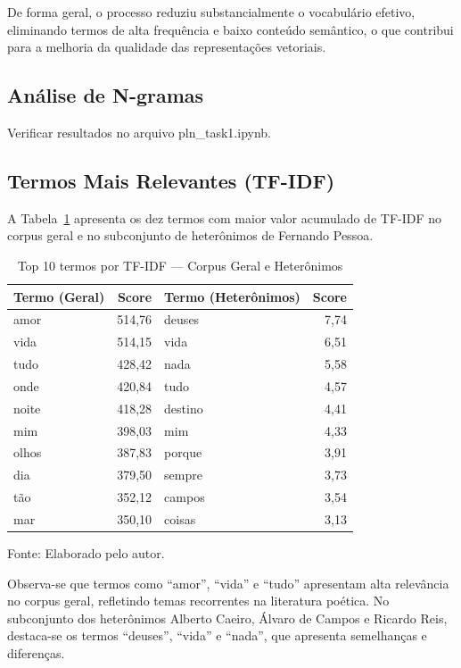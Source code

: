 \documentclass[
	article,
	12pt,
	oneside,
	a4paper,
	english,
	brazil,
	sumario=tradicional
]{abntex2}
\begin{document}
De forma geral, o processo reduziu substancialmente o vocabulário efetivo, eliminando termos de alta frequência e baixo conteúdo semântico, o que contribui para a melhoria da qualidade das representações vetoriais.

\subsection{Análise de N-gramas}

Verificar resultados no arquivo pln\_task1.ipynb.

\subsection{Termos Mais Relevantes (TF-IDF)}

A Tabela~\ref{tab:tfidf} apresenta os dez termos com maior valor acumulado de TF-IDF no corpus geral e no subconjunto de heterônimos de Fernando Pessoa.

\begin{table}[H]
\centering
\caption{Top 10 termos por TF-IDF — Corpus Geral e Heterônimos}
\label{tab:tfidf}
\begin{tabular}{l r l r}
\hline
\textbf{Termo (Geral)} & \textbf{Score} & \textbf{Termo (Heterônimos)} & \textbf{Score} \\
\hline
amor   & 514,76 & deuses  & 7,74 \\
vida   & 514,15 & vida    & 6,51 \\
tudo   & 428,42 & nada    & 5,58 \\
onde   & 420,84 & tudo    & 4,57 \\
noite  & 418,28 & destino & 4,41 \\
mim    & 398,03 & mim     & 4,33 \\
olhos  & 387,83 & porque  & 3,91 \\
dia    & 379,50 & sempre  & 3,73 \\
tão    & 352,12 & campos  & 3,54 \\
mar    & 350,10 & coisas  & 3,13 \\
\hline
\end{tabular}
\par\vspace{2pt}
{\footnotesize Fonte: Elaborado pelo autor.}
\end{table}

Observa-se que termos como ``amor'', ``vida'' e ``tudo'' apresentam alta relevância no corpus geral, refletindo temas recorrentes na literatura poética. No subconjunto dos heterônimos Alberto Caeiro, Álvaro de Campos e Ricardo Reis, destaca-se os termos ``deuses'', ``vida'' e ``nada'', que apresenta semelhanças e diferenças.
\end{document}
